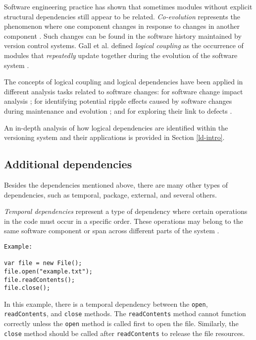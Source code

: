 Software engineering practice has shown that sometimes modules without explicit structural dependencies still appear to be related. \textit{Co-evolution} represents the phenomenon where one component changes in response to changes in another component \cite{Yu:2007:UCC:1231330.1231370, 5166450}. Such changes can be found in the software history maintained by version control systems. Gall et al. defined \textit{logical coupling} as the occurrence of modules that \emph{repeatedly} update together during the evolution of the software system \cite{Gall:1998:DLC:850947.853338, Gall:2003:CRH:942803.943741, 6606615}.

The concepts of logical coupling and logical dependencies have been applied in different analysis tasks related to software changes: for software change impact analysis \cite{1553643}; for identifying potential ripple effects caused by software changes during maintenance and evolution \cite{DBLP:conf/issre/OlivaG15, Oliva:2011:ISL:2067853.2068086, Poshyvanyk2009, posh2010}; and for exploring their link to defects \cite{wiese, Zimmermann:2004:MVH:998675.999460}.

An in-depth analysis of how logical dependencies are identified within the versioning system and their applications is provided in Section \ref{ld-intro}.






\subsection{Additional dependencies}

\hspace{4em} Besides the dependencies mentioned above, there are many other types of dependencies, such as temporal, package, external, and several others.

\textit{Temporal dependencies} represent a type of dependency where certain operations in the code must occur in a specific order. These operations may belong to the same software component or span across different parts of the system \cite{work-dep}.

\begin{verbatim}
Example:

var file = new File();
file.open("example.txt");
file.readContents();
file.close();
\end{verbatim}

In this example, there is a temporal dependency between the \texttt{open}, \texttt{readContents}, and \texttt{close} methods. The \texttt{readContents} method cannot function correctly unless the \texttt{open} method is called first to open the file. Similarly, the \texttt{close} method should be called after \texttt{readContents} to release the file resources.


